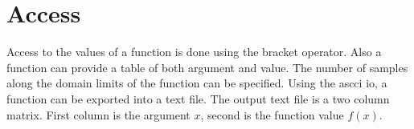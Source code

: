 \section{Access}
%
Access to the values of a function is done using the bracket operator.
%
%
Also a function can provide a table of both argument and value. The number of samples along the domain limits of the function can be specified.
% 
%
Using the ascci io, a function can be exported into a text file.
%
%
The output text file is a two column matrix. First column is the argument $x$, second is the function value $f(x)$.
%

